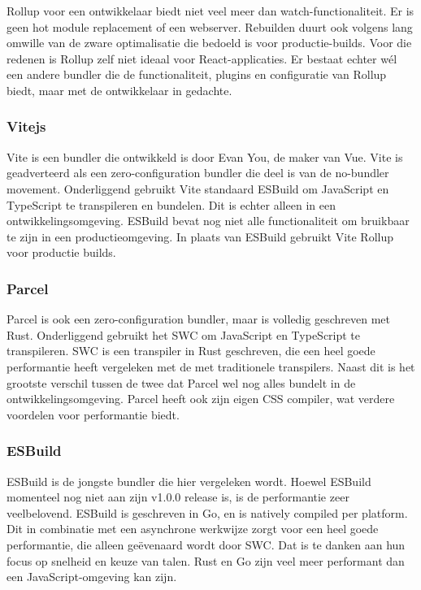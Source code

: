 Rollup voor een ontwikkelaar biedt niet veel meer dan watch-functionaliteit. Er is geen hot module replacement of een webserver. Rebuilden duurt ook volgens \textcite{sweeney_2020} lang omwille van de zware optimalisatie die bedoeld is voor productie-builds. Voor die redenen is Rollup zelf niet ideaal voor React-applicaties. Er bestaat echter wél een andere bundler die de functionaliteit, plugins en configuratie van Rollup biedt, maar met de ontwikkelaar in gedachte.

\subsubsection{Vitejs}

Vite is een bundler die ontwikkeld is door Evan You, de maker van Vue. Vite is geadverteerd als een zero-configuration bundler die deel is van de no-bundler movement. Onderliggend gebruikt Vite standaard ESBuild om JavaScript en TypeScript te transpileren en bundelen. Dit is echter alleen in een ontwikkelingsomgeving. ESBuild bevat nog niet alle functionaliteit om bruikbaar te zijn in een productieomgeving. In plaats van ESBuild gebruikt Vite Rollup voor productie builds. \autocite{you_2021}

\subsubsection{Parcel}

Parcel is ook een zero-configuration bundler, maar is volledig geschreven met Rust. Onderliggend gebruikt het SWC om JavaScript en TypeScript te transpileren. SWC is een transpiler in Rust geschreven, die een heel goede performantie heeft vergeleken met de met traditionele transpilers. Naast dit is het grootste verschil tussen de twee dat Parcel wel nog alles bundelt in de ontwikkelingsomgeving. Parcel heeft ook zijn eigen CSS compiler, wat verdere voordelen voor performantie biedt. \autocite{dahan_2021}

\subsubsection{ESBuild}

ESBuild is de jongste bundler die hier vergeleken wordt. Hoewel ESBuild momenteel nog niet aan zijn v1.0.0 release is, is de performantie zeer veelbelovend. ESBuild is geschreven in Go, en is natively compiled per platform. Dit in combinatie met een asynchrone werkwijze zorgt voor een heel goede performantie, die alleen geëvenaard wordt door SWC. Dat is te danken aan hun focus op snelheid en keuze van talen. Rust en Go zijn veel meer performant dan een JavaScript-omgeving kan zijn. \autocite{eaton_2021}

